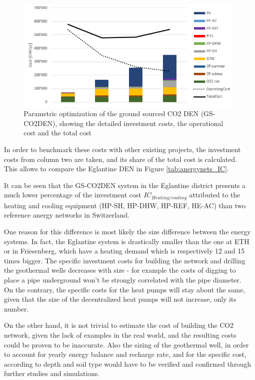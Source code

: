 \documentclass{article}
\begin{document}
\begin{figure}[htp]
	\centering
	\includegraphics[width=1\textwidth]{V_CO2_G_PO1.png}
	\caption{Parametric optimization of the ground sourced CO2 DEN (GS-CO2DEN), showing the detailed investment costs, the operational cost and the total cost}
	\label{fig:V_CO2_G_PO}
\end{figure}

In order to benchmark these costs with other existing projects, the investment costs from column two are taken, and its share of the total cost is calculated. This allows to compare the Eglantine DEN in Figure \ref{tab:anergynets_IC}.



It can be seen that the GS-CO2DEN system in the Eglantine district presents a much lower percentage of the investment cost  $IC_{Heating/cooling}$ attributed to the heating and cooling equipment (HP-SH, HP-DHW, HP-REF, HE-AC) than two reference anergy networks in Switzerland. 

One reason for this difference is most likely the size difference between the energy systems. In fact, the Eglantine system is drastically smaller than the one at ETH or in Friesenberg, which have a heating demand which is respectively 12 and 15 times bigger. The specific investment costs for building the network and drilling the geothermal wells decreases with size - for example the costs of digging to place a pipe underground won't be strongly correlated with the pipe diameter. On the contrary, the specific costs for the heat pumps will stay about the same, given that the size of the decentralized heat pumps will not increase, only its number.

On the other hand, it is not trivial to estimate the cost of building the CO2 network, given the lack of examples in the real world, and the resulting costs could be proven to be inaccurate. Also the sizing of the geothermal well, in order to account for yearly energy balance and recharge rate, and for the specific cost, according to depth and soil type would have to be verified and confirmed through further studies and simulations.
\end{document}
